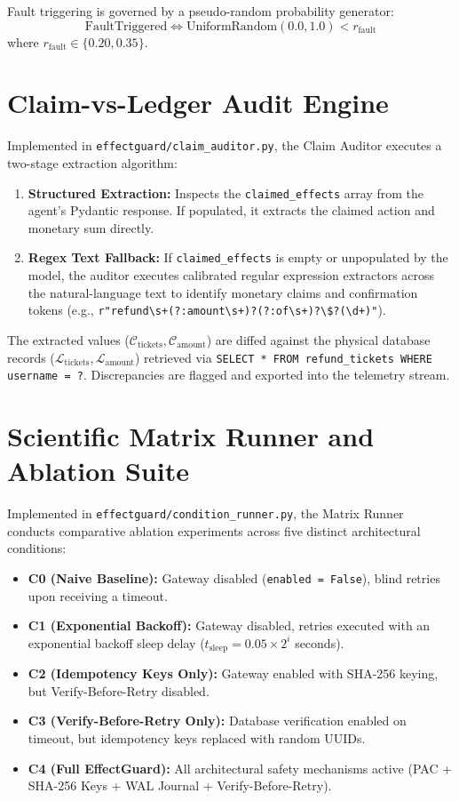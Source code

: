 Fault triggering is governed by a pseudo-random probability generator:
\begin{equation}
    \text{FaultTriggered} \iff \text{UniformRandom}(0.0, 1.0) < r_{\text{fault}}
\end{equation}
where $r_{\text{fault}} \in \{0.20, 0.35\}$.

\section{Claim-vs-Ledger Audit Engine}
\label{sec:impl_claim_auditor}
Implemented in \texttt{effectguard/claim\_auditor.py}, the Claim Auditor executes a two-stage extraction algorithm:
\begin{enumerate}
    \item \textbf{Structured Extraction:} Inspects the \texttt{claimed\_effects} array from the agent's Pydantic response. If populated, it extracts the claimed action and monetary sum directly.
    \item \textbf{Regex Text Fallback:} If \texttt{claimed\_effects} is empty or unpopulated by the model, the auditor executes calibrated regular expression extractors across the natural-language text to identify monetary claims and confirmation tokens (e.g., \texttt{r"refund\textbackslash s+(?:amount\textbackslash s+)?(?:of\textbackslash s+)?\textbackslash \$?(\textbackslash d+)"}).
\end{enumerate}

The extracted values ($\mathcal{C}_{\text{tickets}}, \mathcal{C}_{\text{amount}}$) are diffed against the physical database records ($\mathcal{L}_{\text{tickets}}, \mathcal{L}_{\text{amount}}$) retrieved via \texttt{SELECT * FROM refund\_tickets WHERE username = ?}. Discrepancies are flagged and exported into the telemetry stream.

\section{Scientific Matrix Runner and Ablation Suite}
\label{sec:impl_matrix}
Implemented in \texttt{effectguard/condition\_runner.py}, the Matrix Runner conducts comparative ablation experiments across five distinct architectural conditions:
\begin{itemize}
    \item \textbf{C0 (Naive Baseline):} Gateway disabled (\texttt{enabled = False}), blind retries upon receiving a timeout.
    \item \textbf{C1 (Exponential Backoff):} Gateway disabled, retries executed with an exponential backoff sleep delay ($t_{\text{sleep}} = 0.05 \times 2^i$ seconds).
    \item \textbf{C2 (Idempotency Keys Only):} Gateway enabled with SHA-256 keying, but Verify-Before-Retry disabled.
    \item \textbf{C3 (Verify-Before-Retry Only):} Database verification enabled on timeout, but idempotency keys replaced with random UUIDs.
    \item \textbf{C4 (Full EffectGuard):} All architectural safety mechanisms active (PAC + SHA-256 Keys + WAL Journal + Verify-Before-Retry).
\end{itemize}

